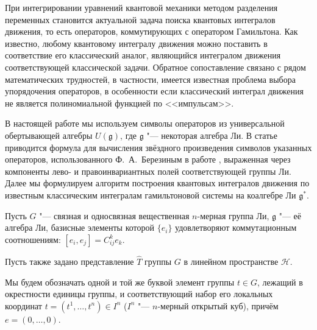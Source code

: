 




\maketitle




При интегрировании уравнений квантовой механики методом разделения переменных становится актуальной задача поиска квантовых интегралов движения, то есть операторов, коммутирующих с оператором Гамильтона. Как известно, любому квантовому интегралу движения можно поставить в соответствие его классический аналог, являющийся интегралом движения соответствующей классической задачи. Обратное сопоставление связано с рядом математических трудностей, в частности, имеется известная проблема выбора упорядочения операторов, в особенности если классический интеграл движения не является полиномиальной функцией по <<импульсам>>.



В настоящей работе мы используем символы операторов из универсальной обертывающей алгебры $ U(\mathfrak{g}) $, где $ \mathfrak{g} $ "--- некоторая алгебра Ли. В статье приводится формула  для вычисления звёздного произведения символов указанных операторов, использованного Ф.~А.~Березиным в работе \cite{Berezin}, выраженная через компоненты лево- и правоинвариантных полей соответствующей группы Ли. Далее мы формулируем алгоритм построения квантовых интегралов движения по известным классическим интегралам гамильтоновой системы на коалгебре Ли $ \mathfrak{g}^* $.



\smallskip




\label{sec:1}

Пусть $G$ "--- связная и односвязная вещественная $n$-мерная группа Ли, $\mathfrak{g}$ "--- её алгебра Ли, базисные элементы которой $\{e_i\}$ удовлетворяют коммутационным соотношениям: $[e_i, e_j]=C_{ij}^ke_k$. 

Пусть также задано представление $\hat T$ группы $G$ в линейном пространстве $\mathcal{H}$. 

Мы будем обозначать одной и той же буквой элемент группы $t\in G$, лежащий в окрестности единицы группы, и соответствующий набор его локальных координат $t=(t^1,\dots,t^n)\in I^n$ ($I^n$ "--- $n$-мерный открытый куб), причём $e=(0,\dots,0)$.  

